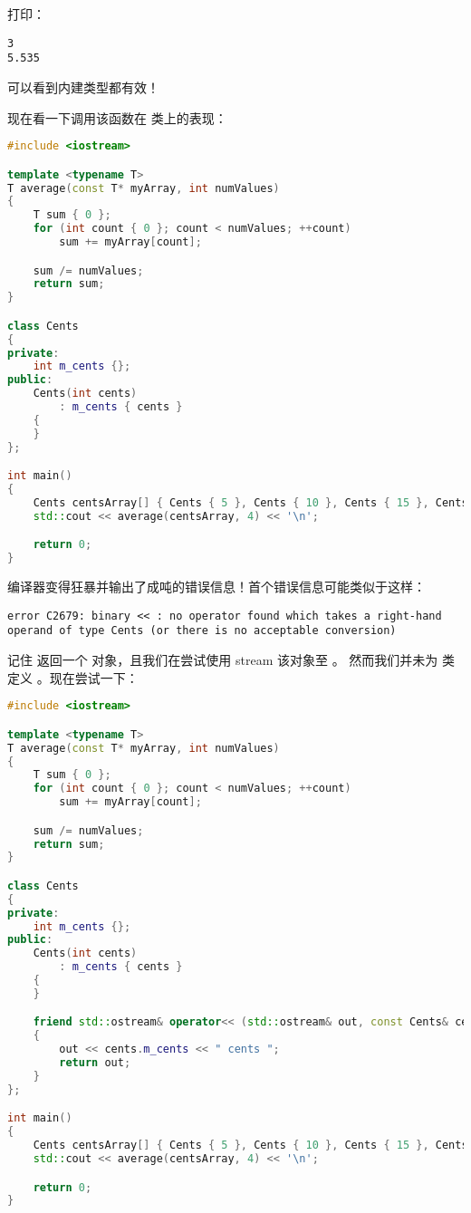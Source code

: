 \documentclass[../../LearnCpp.tex]{subfiles}
\begin{document}
打印：

\begin{lstlisting}
3
5.535
\end{lstlisting}

可以看到内建类型都有效！

现在看一下调用该函数在  类上的表现：

\begin{lstlisting}[language=C++]
#include <iostream>

template <typename T>
T average(const T* myArray, int numValues)
{
    T sum { 0 };
    for (int count { 0 }; count < numValues; ++count)
        sum += myArray[count];

    sum /= numValues;
    return sum;
}

class Cents
{
private:
    int m_cents {};
public:
    Cents(int cents)
        : m_cents { cents }
    {
    }
};

int main()
{
    Cents centsArray[] { Cents { 5 }, Cents { 10 }, Cents { 15 }, Cents { 14 } };
    std::cout << average(centsArray, 4) << '\n';

    return 0;
}
\end{lstlisting}

编译器变得狂暴并输出了成吨的错误信息！首个错误信息可能类似于这样：

\begin{lstlisting}
error C2679: binary << : no operator found which takes a right-hand operand of type Cents (or there is no acceptable conversion)
\end{lstlisting}

记住  返回一个  对象，且我们在尝试使用  stream 该对象至 。
然而我们并未为  类定义 。现在尝试一下：

\begin{lstlisting}[language=C++]
#include <iostream>

template <typename T>
T average(const T* myArray, int numValues)
{
    T sum { 0 };
    for (int count { 0 }; count < numValues; ++count)
        sum += myArray[count];

    sum /= numValues;
    return sum;
}

class Cents
{
private:
    int m_cents {};
public:
    Cents(int cents)
        : m_cents { cents }
    {
    }

    friend std::ostream& operator<< (std::ostream& out, const Cents& cents)
    {
        out << cents.m_cents << " cents ";
        return out;
    }
};

int main()
{
    Cents centsArray[] { Cents { 5 }, Cents { 10 }, Cents { 15 }, Cents { 14 } };
    std::cout << average(centsArray, 4) << '\n';

    return 0;
}
\end{lstlisting}
\end{document}
